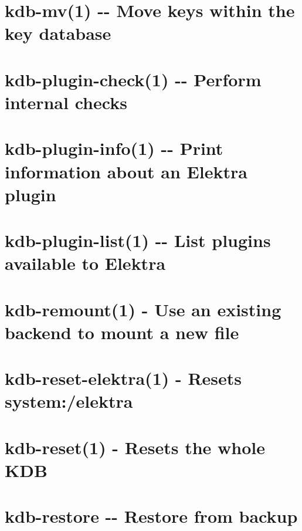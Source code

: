 \documentclass[twoside]{book}
\newcommand{\+}{\discretionary{\mbox{\scriptsize$\hookleftarrow$}}{}{}}
\begin{document}
\chapter{kdb-\/mv(1) -\/-\/ Move keys within the key database}
\label{doc_help_kdb-mv_md}

\chapter{kdb-\/plugin-\/check(1) -\/-\/ Perform internal checks}
\label{doc_help_kdb-plugin-check_md}

\chapter{kdb-\/plugin-\/info(1) -\/-\/ Print information about an Elektra plugin}
\label{doc_help_kdb-plugin-info_md}

\chapter{kdb-\/plugin-\/list(1) -\/-\/ List plugins available to Elektra}
\label{doc_help_kdb-plugin-list_md}

\chapter{kdb-\/remount(1) -\/ Use an existing backend to mount a new file}
\label{doc_help_kdb-remount_md}

\chapter{kdb-\/reset-\/elektra(1) -\/ Resets system\+:/elektra}
\label{doc_help_kdb-reset-elektra_md}

\chapter{kdb-\/reset(1) -\/ Resets the whole K\+DB}
\label{doc_help_kdb-reset_md}

\chapter{kdb-\/restore -\/-\/ Restore from backup}
\label{doc_help_kdb-restore_md}

\end{document}
